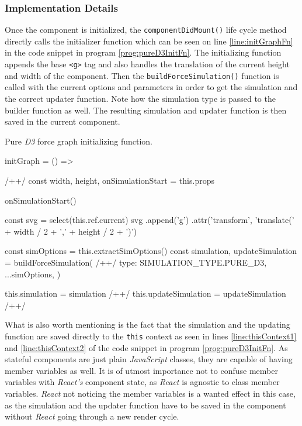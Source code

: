 \subsubsection{Implementation Details}

Once the component is initialized, the \texttt{componentDidMount()} life cycle method directly calls the initializer function which can be seen on line \ref{line:initGraphFn} in the code snippet in program \ref{prog:pureD3InitFn}. The initializing function appends the base \texttt{<g>} tag and also handles the translation of the current height and width of the component. Then the \texttt{buildForceSimulation()} function is called with the current options and parameters in order to get the simulation and the correct updater function. Note how the simulation type is passed to the builder function as well. The resulting simulation and updater function is then saved in the current component.

\begin{program}
\caption{Pure \emph{D3} force graph initializing function.}
\label{prog:pureD3InitFn}
\begin{JsCode}
initGraph = () => { /+\label{line:initGraphFn}+/
  const { width, height, onSimulationStart } = this.props

  onSimulationStart()

  const svg = select(this.ref.current)
  svg
    .append('g')
    .attr('transform', 'translate(' + width / 2 + ',' + height / 2 + ')')

  const simOptions = this.extractSimOptions()
  const { simulation, updateSimulation } = buildForceSimulation({ /+\label{line:buildForceSimulation}+/
    type: SIMULATION_TYPE.PURE_D3,
    ...simOptions,
  })

  this.simulation = simulation /+\label{line:thisContext1}+/
  this.updateSimulation = updateSimulation /+\label{line:thisContext2}+/
}
\end{JsCode}
\end{program}

What is also worth mentioning is the fact that the simulation and the updating function are saved directly to the \texttt{this} context as seen in lines \ref{line:thisContext1} and \ref{line:thisContext2} of the code snippet in program \ref{prog:pureD3InitFn}. As stateful components are just plain \emph{JavaScript} classes, they are capable of having member variables as well. It is of utmost importance not to confuse member variables with \emph{React's} component state, as \emph{React} is agnostic to class member variables. \emph{React} not noticing the member variables is a wanted effect in this case, as the simulation and the updater function have to be saved in the component without \emph{React} going through a new render cycle. 

